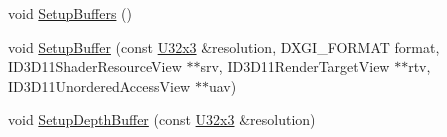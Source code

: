 \begin{DoxyCompactItemize}
void \mbox{\hyperlink{classmage_1_1rendering_1_1_output_manager_a590172441d291329d1f5a9dbbdb71320}{Setup\+Buffers}} ()
\item 
void \mbox{\hyperlink{classmage_1_1rendering_1_1_output_manager_aca32d0307be3acfaa8f5a20fa24b6934}{Setup\+Buffer}} (const \mbox{\hyperlink{namespacemage_a03e3b6f65630005f43a3112d1f6cf57b}{U32x3}} \&resolution, D\+X\+G\+I\+\_\+\+F\+O\+R\+M\+AT format, I\+D3\+D11\+Shader\+Resource\+View $\ast$$\ast$srv, I\+D3\+D11\+Render\+Target\+View $\ast$$\ast$rtv, I\+D3\+D11\+Unordered\+Access\+View $\ast$$\ast$uav)
\item 
void \mbox{\hyperlink{classmage_1_1rendering_1_1_output_manager_a4cbd2dd771206b15d934657205475ae1}{Setup\+Depth\+Buffer}} (const \mbox{\hyperlink{namespacemage_a03e3b6f65630005f43a3112d1f6cf57b}{U32x3}} \&resolution)
\end{DoxyCompactItemize}
